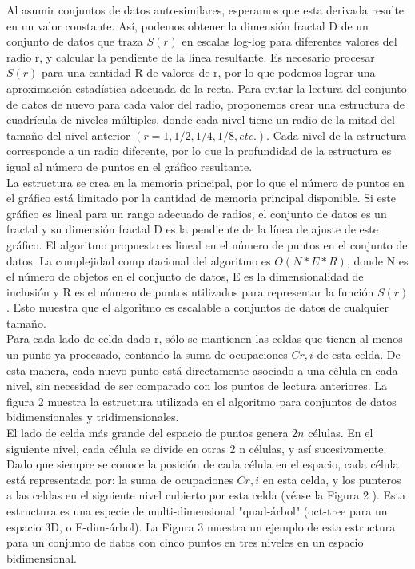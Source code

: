 Al asumir conjuntos de datos auto-similares, esperamos que esta derivada resulte en un valor constante. Así, podemos obtener la dimensión fractal D de un conjunto de datos que traza $S (r)$ en escalas log-log para diferentes valores del radio r, y calcular la pendiente de la línea resultante. Es necesario procesar $S (r)$ para una cantidad R de valores de r, por lo que podemos lograr una aproximación estadística adecuada de la recta. Para evitar la lectura del conjunto de datos de nuevo para cada valor del radio, proponemos crear una estructura de cuadrícula de niveles múltiples, donde cada nivel tiene un radio de la mitad del tamaño del nivel anterior $(r = 1, 1/2, 1 / 4, 1/8, etc.)$. Cada nivel de la estructura corresponde a un radio diferente, por lo que la profundidad de la estructura es igual al número de puntos en el gráfico resultante. \\

La estructura se crea en la memoria principal, por lo que el número de puntos en el gráfico está limitado por la cantidad de memoria principal disponible. Si este gráfico es lineal para un rango adecuado de radios, el conjunto de datos es un fractal y su dimensión fractal D es la pendiente de la línea de ajuste de este gráfico. El algoritmo propuesto es lineal en el número de puntos en el conjunto de datos. La complejidad computacional del algoritmo es $O (N * E * R)$, donde N es el número de objetos en el conjunto de datos, E es la dimensionalidad de inclusión y R es el número de puntos utilizados para representar la función $S (r)$. Esto muestra que el algoritmo es escalable a conjuntos de datos de cualquier tamaño.\\

Para cada lado de celda dado r, sólo se mantienen las celdas que tienen al menos un punto ya procesado, contando la suma de ocupaciones $C r, i $ de esta celda. De esta manera, cada nuevo punto está directamente asociado a una célula en cada nivel, sin necesidad de ser comparado con los puntos de lectura anteriores. La figura 2 muestra la estructura utilizada en el algoritmo para conjuntos de datos bidimensionales y tridimensionales.\\

El lado de celda más grande del espacio de puntos genera $2 n$ células. En el siguiente nivel, cada célula se divide en otras 2 n células, y así sucesivamente. Dado que siempre se conoce la posición de cada célula en el espacio, cada célula está representada por: la suma de ocupaciones $C r, i$ en esta celda, y los punteros a las celdas en el siguiente nivel cubierto por esta celda (véase la Figura 2 ). Esta estructura es una especie de multi-dimensional "quad-árbol" (oct-tree para un espacio 3D, o E-dim-árbol). La Figura 3 muestra un ejemplo de esta estructura para un conjunto de datos con cinco puntos en tres niveles en un espacio bidimensional.\\


